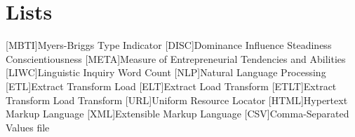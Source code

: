 \appendix
\renewcommand{\appendixtocname}{Appendix}
\renewcommand{\appendixpagename}{\appendixtocname}
\addappheadtotoc
{}
\appendixpage

\chapter{Lists}
\begin{acronym}[\hspace{3cm}]
  [MBTI]{Myers-Briggs Type Indicator \cite{kerz2022pushing}}
  [DISC]{Dominance Influence Steadiness Conscientiousness\cite{kerz2022pushing}}
  [META]{Measure of Entrepreneurial Tendencies and Abilities \cite{postigo2021general}}
  [LIWC]{Linguistic Inquiry Word Count \cite{pennebaker1999linguistic}}
  [NLP]{Natural Language Processing}
  [ETL]{Extract Transform Load}
  [ELT]{Extract Load Transform}
  [ETLT]{Extract Transform Load Transform}
  [URL]{Uniform Resource Locator}
  [HTML]{Hypertext Markup Language}
  [XML]{Extensible Markup Language}
  [CSV]{Comma-Separated Values file}
\end{acronym}
\clearpage
\listoffigures
{}
\listoftables
{}
